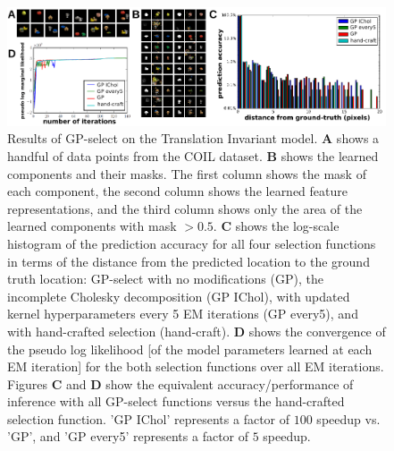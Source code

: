 \begin{figure}[ht!]%
\centering
\includegraphics[width=\textwidth]{inveca/invec_mod.pdf}%
\caption{Results of GP-select on the Translation Invariant model.
\textbf{A} shows a handful of data points from the COIL dataset.
\textbf{B} shows the learned components and their masks. The first column shows the mask of each component, the second column shows the learned feature representations, and the third column shows only the area of the learned components with mask $>0.5$.
\textbf{C} shows the log-scale histogram of the prediction accuracy for all four selection functions in terms of the distance from the predicted location to the ground truth location: GP-select with no modifications (GP), the incomplete Cholesky decomposition (GP IChol), with updated kernel hyperparameters every 5 EM iterations (GP every5), and with hand-crafted selection (hand-craft).
\textbf{D} shows the convergence of the pseudo log likelihood [of the model parameters learned at each EM iteration] for the both selection functions over all EM iterations. 
Figures \textbf{C} and \textbf{D} show the equivalent accuracy/performance of inference with all GP-select functions versus the hand-crafted selection function.
'GP IChol' represents a factor of $100$ speedup vs. 'GP', and 'GP every5' represents a factor of $5$ speedup.
}
\label{fig:inveca}
\end{figure}

